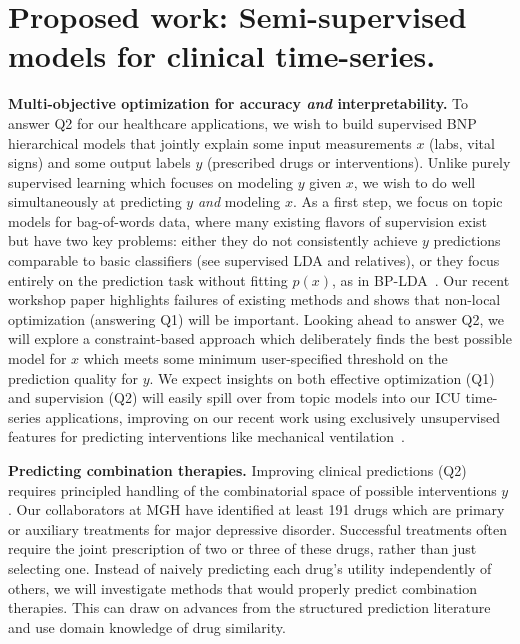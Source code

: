 \documentclass[11pt,letterpaper]{article}
\begin{document}
\section{Proposed work: Semi-supervised models for clinical time-series.}

\textbf{Multi-objective optimization for accuracy \emph{and} interpretability.}
To answer Q2 for our healthcare applications, we wish to build supervised BNP hierarchical models that jointly explain some input measurements $x$ (labs, vital signs) and some output labels $y$ (prescribed drugs or interventions).
Unlike purely supervised learning which focuses on modeling $y$ given $x$, we wish to do well simultaneously at predicting $y$ \emph{and} modeling $x$.
As a first step, we focus on topic models for bag-of-words data, where many existing flavors of supervision exist but have two key problems: either they do not consistently achieve $y$ predictions comparable to basic classifiers (see supervised LDA \citep{blei2007sLDA} and relatives), or they focus entirely on the prediction task without fitting $p(x)$, as in BP-LDA~\citep{chen2015bplda}. 
Our recent workshop paper
\citep{hughes2016clinicalSLDA} highlights failures of existing methods and shows that non-local optimization (answering Q1) will be important. Looking ahead to answer Q2, we will explore a constraint-based approach which deliberately finds the best possible model for $x$ which meets some minimum user-specified threshold on the prediction quality for $y$. We expect insights on both effective optimization (Q1) and supervision (Q2) will easily spill over from topic models into our ICU time-series applications, improving on our recent work using exclusively unsupervised features for predicting interventions like mechanical ventilation~\citep{ghassemi2017ssam}.

\textbf{Predicting combination therapies.}
Improving clinical predictions (Q2) requires principled handling of the combinatorial space of possible interventions $y$. Our collaborators at MGH have identified at least 191 drugs which are primary or auxiliary treatments for major depressive disorder. Successful treatments often require the joint prescription of two or three of these drugs, rather than just selecting one. 
Instead of naively predicting each drug's utility independently of others, we will investigate methods that would properly predict combination therapies. This can draw on advances from the structured prediction literature and use domain knowledge of drug similarity.
\end{document}
